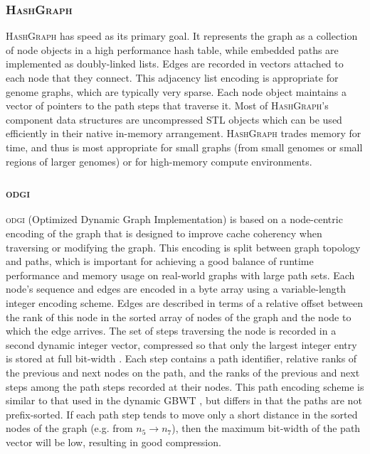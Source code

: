 \documentclass{article}
\begin{document}
\subsubsection{\textsc{HashGraph}}

\textsc{HashGraph} has speed as its primary goal.
It represents the graph as a collection of node objects in a high performance hash table, while embedded paths are implemented as doubly-linked lists.
Edges are recorded in vectors attached to each node that they connect.
This adjacency list encoding is appropriate for genome graphs, which are typically very sparse.
Each node object maintains a vector of pointers to the path steps that traverse it.
Most of \textsc{HashGraph}'s component data structures are uncompressed STL objects which can be used efficiently in their native in-memory arrangement.
\textsc{HashGraph} trades memory for time, and thus is most appropriate for small graphs (from small genomes or small regions of larger genomes) or for high-memory compute environments.

\subsubsection{\textsc{odgi}}

\textsc{odgi} (Optimized Dynamic Graph Implementation) is based on a node-centric encoding of the graph that is designed to improve cache coherency when traversing or modifying the graph.
This encoding is split between graph topology and paths, which is important for achieving a good balance of runtime performance and memory usage on real-world graphs with large path sets.
Each node's sequence and edges are encoded in a byte array using a variable-length integer encoding scheme.
Edges are described in terms of a relative offset between the rank of this node in the sorted array of nodes of the graph and the node to which the edge arrives.
The set of steps traversing the node is recorded in a second dynamic integer vector, compressed so that only the largest integer entry is stored at full bit-width \cite{prezza2017framework}.
Each step contains a path identifier, relative ranks of the previous and next nodes on the path, and the ranks of the previous and next steps among the path steps recorded at their nodes.
This path encoding scheme is similar to that used in the dynamic GBWT \cite{Siren_2019}, but differs in that the paths are not prefix-sorted.
If each path step tends to move only a short distance in the sorted nodes of the graph (e.g. from $n_{5} \to n_{7}$), then the maximum bit-width of the path vector will be low, resulting in good compression.
\end{document}
